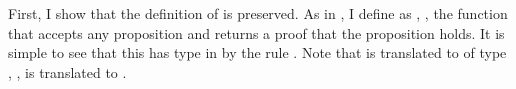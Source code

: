 First, I show that the definition of \im{\False} is preserved.
As in , I define \im{\tFalse} as
\im{\cpspity{\cpsalpha}{\cpsstarty}{\cpsalpha}}, \ie, the function that accepts
any proposition and returns a proof that the proposition holds.
It is simple to see that this  has type \im{\cpsstarty} in \cpstlang
by the rule .
Note that \im{{\cpspity{\cpsalpha}{\cpsstarty}{\cpsalpha}}} is translated to
\im{\ccpity{\ccalpha}{\ccstarty}{\ccalpha}} of type \im{\ccstarty}, \ie,
\im{\tFalse} is translated to \im{\ccFalse}.
\begin{lemma}
  \label{lem:cps:false-pres}
  \im{\anfjudg{\cpslenv}{(\cpspity{\cpsalpha}{\cpsstarty}{\cpsalpha})}{\cpsstarty}{\ccpity{\ccalpha}{\ccstarty}{\ccalpha}}}
\end{lemma}

